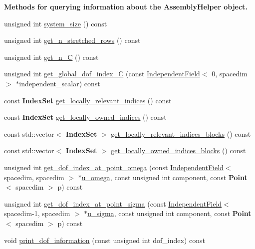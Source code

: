 \begin{Indent}{\bf Methods for querying information about the Assembly\+Helper object.}
\begin{DoxyCompactItemize}
\item 
unsigned int \hyperlink{class_assembly_helper_a7de6972444e41dadb8eaac8024b261f6}{system\+\_\+size} () const 
\item 
unsigned int \hyperlink{class_assembly_helper_a5cd3242e02bc5cb8b74cf808df257da0}{get\+\_\+n\+\_\+stretched\+\_\+rows} () const 
\item 
unsigned int \hyperlink{class_assembly_helper_ad6590021b351fac59dcc655e3d0da9ee}{get\+\_\+n\+\_\+C} () const 
\item 
unsigned int \hyperlink{class_assembly_helper_a035fabd9601baf9efade5393164ea370}{get\+\_\+global\+\_\+dof\+\_\+index\+\_\+C} (const \hyperlink{class_independent_field}{Independent\+Field}$<$ 0, spacedim $>$ $\ast$independent\+\_\+scalar) const 
\item 
const {\bf Index\+Set} \hyperlink{class_assembly_helper_ae6c72b5ed3b1cd419d58e081562e0ee7}{get\+\_\+locally\+\_\+relevant\+\_\+indices} () const 
\item 
const {\bf Index\+Set} \hyperlink{class_assembly_helper_a51d99905072b1e6d1aadc43e62c5af92}{get\+\_\+locally\+\_\+owned\+\_\+indices} () const 
\item 
const std\+::vector$<$ {\bf Index\+Set} $>$ \hyperlink{class_assembly_helper_ae405978288614436b0851e1d9047f084}{get\+\_\+locally\+\_\+relevant\+\_\+indices\+\_\+blocks} () const 
\item 
const std\+::vector$<$ {\bf Index\+Set} $>$ \hyperlink{class_assembly_helper_a1d0898b738b49d1ed38448d5686e19ba}{get\+\_\+locally\+\_\+owned\+\_\+indices\+\_\+blocks} () const 
\item 
unsigned int \hyperlink{class_assembly_helper_a53c369b25d3a595229a9834950200da7}{get\+\_\+dof\+\_\+index\+\_\+at\+\_\+point\+\_\+omega} (const \hyperlink{class_independent_field}{Independent\+Field}$<$ spacedim, spacedim $>$ $\ast$\hyperlink{class_assembly_helper_a1952a054a839a7a683ca108013e7d976}{u\+\_\+omega}, const unsigned int component, const {\bf Point}$<$ spacedim $>$ p) const 
\item 
unsigned int \hyperlink{class_assembly_helper_a8c3efbac750aa236f8b116af994c07ee}{get\+\_\+dof\+\_\+index\+\_\+at\+\_\+point\+\_\+sigma} (const \hyperlink{class_independent_field}{Independent\+Field}$<$ spacedim-\/1, spacedim $>$ $\ast$\hyperlink{class_assembly_helper_a696fe649b3503561235aa1ccbf2ddeef}{u\+\_\+sigma}, const unsigned int component, const {\bf Point}$<$ spacedim $>$ p) const 
\item 
void \hyperlink{class_assembly_helper_a532f565a8725675fcca12c1f8c669a44}{print\+\_\+dof\+\_\+information} (const unsigned int dof\+\_\+index) const 
\end{DoxyCompactItemize}
\end{Indent}
